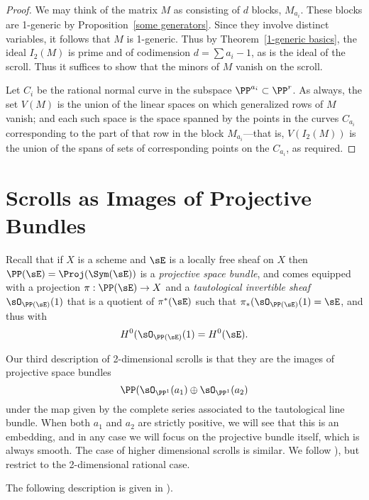 \begin{proof} We may think of the matrix $M$ as consisting of $d$ blocks, $M_{a_{i}}$. These blocks are 1-generic by Proposition~\ref{some generators}. Since they involve distinct variables, it follows that $M$ is 1-generic. Thus by
Theorem~\ref{1-generic basics}, the ideal $I_{2}(M)$ is prime and of codimension $d = \sum a_{i}-1$, as is the ideal of the scroll. Thus it suffices to show that the minors of $M$ vanish on the scroll.

Let $C_{i}$ be the rational normal curve in the subspace $\PP^{a_{i}}\subset\PP^{r}$.
As always, the set $V(M)$ is the union of the linear spaces on which generalized rows of $M$ vanish; and each such space is the space spanned by the points in the curves $C_{a_{i}}$ corresponding to the part of that row in the block $M_{a_{i}}$---that is, $V(I_{2}(M))$ is the union of the spans of sets of corresponding points on the $C_{a_{i}}$, as required.
\end{proof}

 
 



\section{Scrolls as Images of Projective Bundles}\label{inscrutable name}

Recall that if $X$ is a scheme and $\sE$ is a locally free sheaf on $X$ then $\PP(\sE) = \Proj(\Sym(\sE))$ is a \emph{projective space bundle}, and comes equipped with a projection $\pi: \PP(\sE) \to X$ and a \emph{tautological invertible sheaf} $\sO_{\PP(\sE)}(1)$ that is a quotient of $\pi^{*}(\sE)$ such that $\pi_{*}(\sO_{\PP(\sE)}(1) = \sE$, and thus with
$$
H^{0}(\sO_{\PP(\sE)}(1) = H^{0}(\sE).
$$

Our third description of 2-dimensional scrolls is that they are the images of projective space bundles 
$$
\PP(\sO_{\PP^{1}}(a_{1})\oplus \sO_{\PP^{1}}(a_{2})
$$ 
under the map given by the complete series associated to the tautological line bundle. When both $a_{1}$ and $a_{2}$ are strictly positive, we will see that this is an embedding, and in any case we will focus on the projective bundle itself, which is always smooth. The case of higher dimensional scrolls is similar. We follow  \cite[Chapter V]{Hartshorne1977}), but restrict
to the 2-dimensional rational case. 

The following description is  given in  \cite[Proposition V.2.2 and V.2.3]{Hartshorne1977}).

